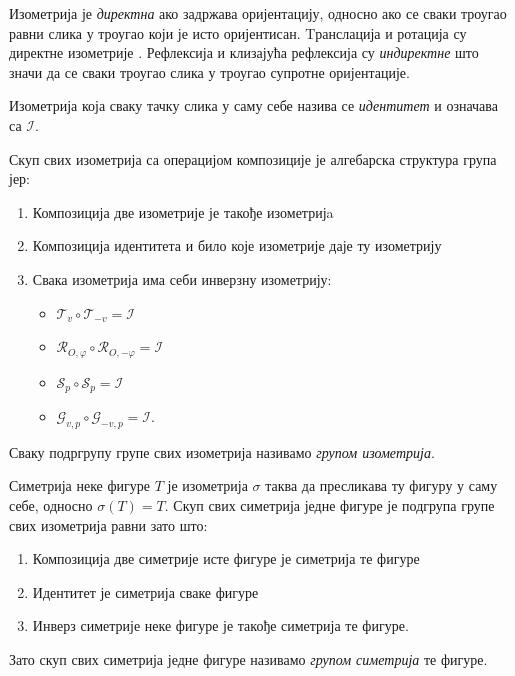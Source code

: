 \documentclass[12pt]{article}
\begin{document}
Изометрија је \emph{директна} ако задржава оријентацију, односно ако се сваки троугао равни слика у троугао који је исто оријентисан. Tранслација и ротација су директне изометрије . Рефлексија и клизајућа рефлексија су \emph{индиректне} што значи да се сваки троугао слика у троугао супротне оријентације.

Изометрија која сваку тачку слика у саму себе назива се \emph{идентитет} и означава са $\mathcal{I}$.

Скуп свих изометрија са операцијом композиције је алгебарска структура група јер:
\begin{enumerate}
\item Композиција две изометрије је такође изометријa
    \item Композиција идентитета и било које изометрије даје ту изометрију
    
    \item Свака изометрија има себи инверзну изометрију:
    \begin{itemize}
        \item $\mathcal{T}_v \circ \mathcal{T}_{-v} = \mathcal{I}$
        \item $\mathcal{R}_{O,\varphi} \circ \mathcal{R}_{O,-\varphi} = \mathcal{I}$
        \item $\mathcal{S}_p \circ \mathcal{S}_p = \mathcal{I}$
        \item $\mathcal{G}_{v,p} \circ \mathcal{G}_{-v,p} = \mathcal{I}$.
    \end{itemize}
    
\end{enumerate}

Сваку подргрупу групе свих изометрија називамо \emph{групом изометрија}. 

Симетрија неке фигуре $T$ је изометрија $\sigma$ таква да пресликава ту фигуру у саму себе, односно $\sigma(T) = T$. Скуп свих симетрија једне фигуре је подгрупа групе свих изометрија равни зато што:
\begin{enumerate}
    \item Композиција две симетрије исте фигуре је симетрија те фигуре
    \item Идентитет је симетрија сваке фигуре
    \item Инверз симетрије неке фигуре је такође симетрија те фигуре.

\end{enumerate}

Зато скуп свих симетрија једне фигуре називамо \emph{групом симетрија} те фигуре.
\end{document}
